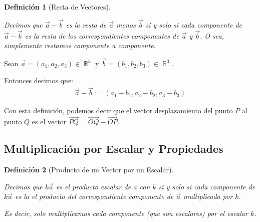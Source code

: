 \documentclass[12pt, fleqn]{report}                             %
\newtheorem{Definition}{Definición}[section]                    %
\theoremstyle{break}                                            %
\DeclareMathOperator \Reals        {\mathbb{R}}                 %
\newcommand{\lVec}[1]{\overrightarrow{#1}}                      %
\begin{document}
                \vspace{2em}

                \begin{Definition}[Resta de Vectores]
                    \label{DefRestaVectores}

                    Decimos que $\vec{a}-\vec{b}$ es la resta de $\vec{a}$ menos $\vec{b}$ si y solo si 
                    cada componente de $\vec{a}-\vec{b}$ es la resta de los correspondientes componentes
                    de $\vec{a}$ y $\vec{b}$.
                    O sea, simplemente restamos componente a componente.
                    
                \end{Definition}

                Sean $\vec{a} = (a_1, a_2, a_3) \in \Reals^3$ y $\vec{b}=(b_1, b_2, b_3) \in \Reals^3$.

                Entonces decimos que:
                \begin{align}
                    \vec{a} - \vec{b} := (a_1 - b_1, a_2 - b_2, a_3 - b_3)
                \end{align}
            
                Con esta definición, podemos decir que el vector desplazamiento del punto $P$ al punto $Q$
                es el vector $\lVec{PQ} = \lVec{OQ} - \lVec{OP}$.
                
            \clearpage
            \subsection{Multiplicación por Escalar y Propiedades}

                \begin{Definition}[Producto de un Vector por un Escalar]
                    \label{DefProductoVectorEscalar}

                    Decimos que $k \vec{a}$ es el producto escalar de $a$ con $k$
                    si y solo si cada componente de $k \vec{a}$ es la el producto del correspondiente componente
                    de $\vec{a}$ multiplicada por $k$.

                    Es decir, solo multiplicamos cada componente (que son escalares) por el escalar $k$.

                \end{Definition}
\end{document}
